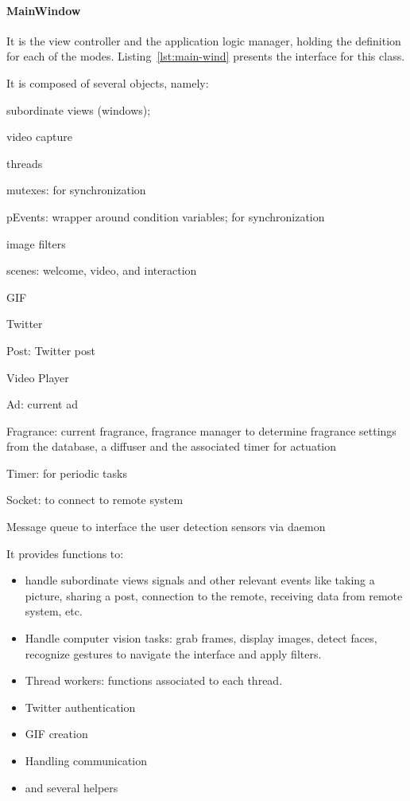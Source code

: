 

\paragraph{\textbf{MainWindow}}
It is the view controller and the application logic manager, holding the
definition for each of the modes.
Listing~\ref{lst:main-wind} presents the interface for this class.



It is
composed of several objects, namely:
\begin{item-c}
\item subordinate views (windows);
\item video capture
\item threads
\item mutexes: for synchronization
\item pEvents: wrapper around condition variables; for synchronization
\item image filters
\item scenes: welcome, video, and interaction
\item GIF
\item Twitter
\item Post: Twitter post
\item Video Player
\item Ad: current ad
\item Fragrance: current fragrance, fragrance manager to determine fragrance
  settings from the database, a diffuser and the associated timer for actuation
\item Timer: for periodic tasks
\item Socket: to connect to remote system
\item Message queue to interface the user detection sensors via daemon
\end{item-c}

It provides functions to:
\begin{itemize}
\item handle subordinate views signals and other relevant events like taking a
  picture, sharing a post, connection to the remote, receiving data from remote
  system, etc.
\item Handle computer vision tasks: grab frames, display images, detect faces,
  recognize gestures to navigate the interface and apply filters.
\item Thread workers: functions associated to each thread.
\item Twitter authentication
\item GIF creation
\item Handling communication
\item and several helpers
\end{itemize}

